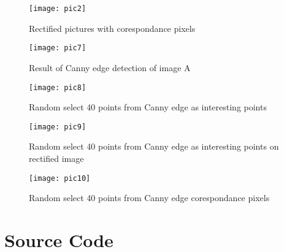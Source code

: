 \documentclass[11pt]{article}
\begin{document}
\begin{figure}[H]
\centering
\texttt{[image: pic2]}
\caption{Rectified pictures with corespondance pixels}
\label{}
\end{figure}

\begin{figure}[H]
\centering
\texttt{[image: pic7]}
\caption{Result of Canny edge detection of image A}
\label{}
\end{figure}

\begin{figure}[H]
\centering
\texttt{[image: pic8]}
\caption{Random select 40 points from Canny edge as interesting points}
\label{}
\end{figure}

\begin{figure}[H]
\centering
\texttt{[image: pic9]}
\caption{Random select 40 points from Canny edge as interesting points on rectified image}
\label{}
\end{figure}

\begin{figure}[H]
\centering
\texttt{[image: pic10]}
\caption{Random select 40 points from Canny edge corespondance pixels}
\label{}
\end{figure}


\newpage
\section*{Source Code}
\end{document}
